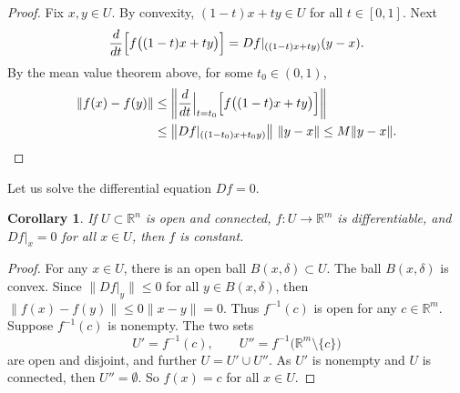 \documentclass[12pt,openany]{book}
\newcommand{\snorm}[1]{\lVert {#1} \rVert}
\newcommand{\norm}[1]{\left\lVert {#1} \right\rVert}
\newcommand{\R}{{\mathbb{R}}}
\theoremstyle{plain}
\newtheorem{cor}[thm]{Corollary}
\theoremstyle{remark}
\theoremstyle{definition}
\theoremstyle{exercise}
\theoremstyle{example}
\begin{document}
\begin{proof}
Fix $x,y \in U$.  By convexity,
$(1-t)x+ty \in U$ for all $t \in [0,1]$.
Next
\begin{equation*}
\frac{d}{dt} \Bigl[f\bigl((1-t)x+ty\bigr)\Bigr]
=
Df|_{((1-t)x+ty)} (y-x) .
\end{equation*}
By the mean value theorem above, for
some $t_0 \in (0,1)$,
\begin{equation*}
\begin{split}
\snorm{f(x)-f(y)} & \leq
\norm{\frac{d}{dt} \Big|_{t=t_0} \Bigl[ f\bigl((1-t)x+ty\bigr) \Bigr] }
\\
& \leq
\norm{Df|_{((1-t_0)x+t_0y)}} \, \snorm{y-x} \leq
M \snorm{y-x} . \qedhere
\end{split}
\end{equation*}
\end{proof}

Let us solve the differential equation $Df = 0$.

\begin{cor} \label{thm:svzerodersol}
If $U \subset \R^n$ is open and connected, $f \colon U \to \R^m$ is differentiable,
and $Df|_x = 0$ for all $x \in U$, then $f$ is constant.
\end{cor}

\begin{proof}
For any $x \in U$, there is an open ball $B(x,\delta) \subset U$.  The ball
$B(x,\delta)$ is convex.  Since
$\snorm{Df|_y} \leq 0$ for all $y \in B(x,\delta)$, then
$\snorm{f(x)-f(y)} \leq 0 \snorm{x-y} = 0$.
Thus $f^{-1}(c)$ is open for any $c \in \R^m$.  Suppose
$f^{-1}(c)$ is nonempty.  
The two sets
\begin{equation*}
U' = f^{-1}(c), \qquad U'' = f^{-1}\bigl(\R^m\setminus\{c\}\bigr)
\end{equation*}
are open and disjoint, and further $U = U' \cup U''$.  As $U'$ is nonempty
and $U$ is connected, then $U'' = \emptyset$.  So $f(x) = c$ for all $x \in U$.
\end{proof}
\end{document}
